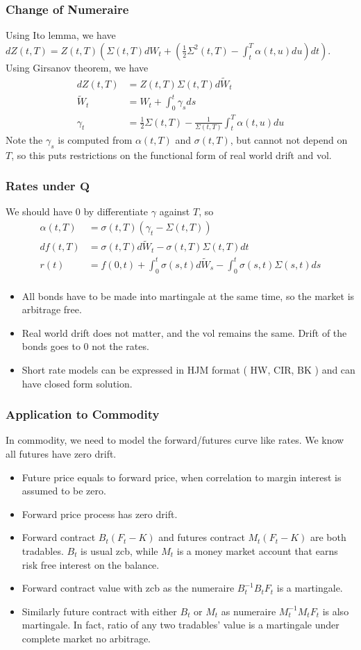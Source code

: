 \documentclass[]{beamer}
\begin{document}
\begin{frame}
  \frametitle{Change of Numeraire}
  Using Ito lemma, we have $dZ(t,T) = Z(t,T) \left( \Sigma(t,T)dW_t + (\frac{1}{2}\Sigma^2(t,T) - \int_t^T \alpha(t,u)du)dt\right)$. Using Girsanov theorem, we have 
  \begin{align*}
    dZ(t,T) &=Z(t,T)\Sigma(t,T)d\tilde{W}_t \\
    \tilde{W}_t &= W_t + \int_0^t \gamma_s ds \\
    \gamma_t &= \frac{1}{2} \Sigma(t,T) - \frac{1}{\Sigma(t,T)}\int_t^T \alpha(t,u) du
  \end{align*}
  Note the $\gamma_s$ is computed from $\alpha(t,T)$ and $\sigma(t,T)$, but cannot not depend on $T$, so this puts restrictions on the functional form of real world drift and vol.
\end{frame}
\begin{frame}
  \frametitle{Rates under $\mathbf{Q}$}
  We should have 0 by differentiate $\gamma$ against $T$, so
  \begin{align*}
    \alpha(t,T) &= \sigma(t,T)( \gamma_t - \Sigma(t,T)) \\
    df(t,T) &= \sigma(t,T)d\tilde{W}_t - \sigma(t,T) \Sigma(t,T)dt \\
    r(t) &= f(0,t) + \int_0^t\sigma(s,t)d\tilde{W}_s - \int_0^t \sigma(s,t) \Sigma(s,t)ds \\
  \end{align*}
  \begin{itemize}
  \item All bonds have to be made into martingale at the same time, so the market is arbitrage free.
  \item Real world drift does not matter, and the vol remains the same. Drift of the bonds goes to 0 not the rates.
  \item Short rate models can be expressed in HJM format ( HW, CIR, BK ) and can have closed form solution. 
  \end{itemize}
\end{frame}
\begin{frame}
  \frametitle{Application to Commodity}
  In commodity, we need to model the forward/futures curve like rates. We know all futures have zero drift.
  \begin{itemize}
  \item Future price equals to forward price, when correlation to margin interest is assumed to be zero.
  \item Forward price process has zero drift.
  \item Forward contract $B_t(F_t-K)$ and futures contract $M_t(F_t-K)$ are both tradables. $B_t$ is usual zcb, while $M_t$ is a money market account that earns risk free interest on the balance.
  \item Forward contract value with zcb as the numeraire $B_t^{-1} B_t F_t$ is a martingale.
  \item Similarly future contract with either $B_t$ or $M_t$ as numeraire $M_t^{-1}M_tF_t$ is also martingale. In fact, ratio of any two tradables' value is a martingale under complete market no arbitrage.
  \end{itemize}
\end{frame}
\end{document}
